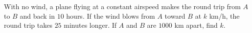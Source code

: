 With no wind, a plane flying at a constant airspeed makes the round trip from $A$ to $B$ and back in $10$ hours. If the wind blows from $A$ toward $B$ at $k$ km/h, the round trip takes $25$ minutes longer. If $A$ and $B$ are $1000$ km apart, find $k$.

